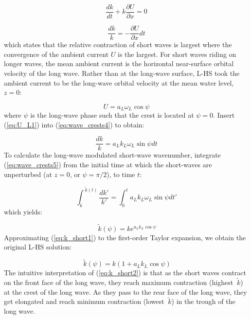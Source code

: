 \documentclass[draft]{agujournal2019}
\begin{document}
\begin{equation}
\label{eq:wave_crests3}
\dfrac{d k}{dt}
+ k \dfrac{\partial U}{\partial x}
= 0
\end{equation}

\begin{equation}
\label{eq:wave_crests4}
\dfrac{d k}{k}
= - \dfrac{\partial U}{\partial x} dt
\end{equation}
which states that the relative contraction of short waves is largest where the
convergence of the ambient current $U$ is the largest.
For short waves riding on longer waves, the mean ambient current is the
horizontal near-surface orbital velocity of the long wave.
Rather than at the long-wave surface, L-HS took the ambient current to be the
long-wave orbital velocity at the mean water level, $z = 0$:

\begin{equation}
\label{eq:U_L1}
U = a_L \omega_L \cos{\psi}
\end{equation}
where $\psi$ is the long-wave phase such that the crest is located
at $\psi = 0$.
Insert (\ref{eq:U_L1}) into (\ref{eq:wave_crests4}) to obtain:

\begin{equation}
\label{eq:wave_crests5}
\dfrac{d k}{k}
= a_L k_L \omega_L \sin{\psi} dt
\end{equation}
To calculate the long-wave modulated short-wave wavenumber, integrate
(\ref{eq:wave_crests5}) from the initial time at which the short-waves
are unperturbed (at $z=0$, or $\psi=\pi/2$), to time $t$:

\begin{equation}
\label{eq:wave_crests6}
\int_k^{\ \widetilde k(t)} \dfrac{d k'}{k'}
= \int_0^t a_L k_L \omega_L \sin{\psi} dt'
\end{equation}
which yields:

\begin{equation}
\label{eq:k_short1}
\ \widetilde k(\psi) = k e^{a_L k_L \cos{\psi}}
\end{equation}
Approximating (\ref{eq:k_short1}) to the first-order Taylor expansion,
we obtain the original L-HS solution:

\begin{equation}
\label{eq:k_short2}
\ \widetilde k(\psi) = k (1 + a_L k_L \cos{\psi})
\end{equation}
The intuitive interpretation of (\ref{eq:k_short2}) is that as the short waves
contract on the front face of the long wave, they reach maximum contraction
(highest $\ \widetilde k$) at the crest of the long wave.
As they pass to the rear face of the long wave, they get elongated and reach
minimum contraction (lowest $\ \widetilde k$) in the trough of the long wave.
\end{document}
